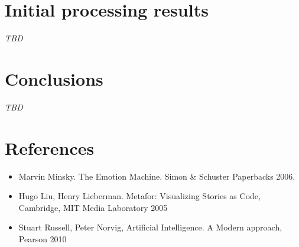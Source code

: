 \documentclass[12pt]{article}
\begin{document}
\section{Initial processing results}

\emph{TBD}

\section{Conclusions}

\emph{TBD}

\section{References}

\begin{itemize}
 \item Marvin Minsky. The Emotion Machine. Simon \& Schuster Paperbacks 2006.
 \item Hugo Liu, Henry Lieberman. Metafor: Visualizing Stories as Code, Cambridge, MIT Media Laboratory 2005
 \item Stuart Russell, Peter Norvig, Artificial Intelligence. A Modern approach, Pearson 2010
\end{itemize}
\end{document}
